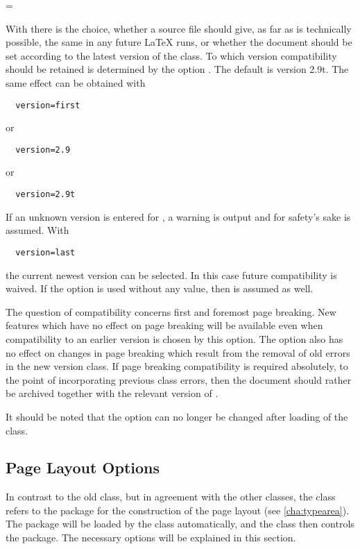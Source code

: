 \begin{Declaration}
  =
\end{Declaration}
%
With  there is the
choice, whether a source file should give, as far as is technically
possible, the same in any future {\LaTeX} runs, or whether the
document should be set according to the latest version of the
class. To which version compatibility should be retained is determined
by the option . The default is version 2.9t. The same effect can be obtained with
\begin{lstlisting}
  version=first
\end{lstlisting}
or
\begin{lstlisting}
  version=2.9
\end{lstlisting}
or
\begin{lstlisting}
  version=2.9t
\end{lstlisting}
If an unknown version is entered for , a warning is
output and for safety's sake  is
assumed. With
\begin{lstlisting}
  version=last
\end{lstlisting}
the current newest version can be selected. In this case future
compatibility is waived. If the option is used without any value, then
 is assumed as well.

The question of compatibility concerns first and foremost page
breaking. New features which have no effect on page breaking will be
available even when compatibility to an earlier version is chosen by
this option. The option also has no effect on changes in page breaking
which result from the removal of old errors in the new version
class. If page breaking compatibility is required absolutely, to the
point of incorporating previous class errors, then the document should
rather be archived together with the relevant version of \KOMAScript.

It should be noted that the option  can no longer be
changed after loading of the class.%
%
%
%
%

\subsection{Page Layout Options}
\label{sec:scrlttr2.typeareaOptions}
%

In contrast to the old  class, but in agreement with
the other {\KOMAScript} classes, the  class refers to
the  package for the construction of the page layout
(see \autoref{cha:typearea}). The package will be loaded by the class
automatically, and the class then controls the package. The necessary
options will be explained in this section.

